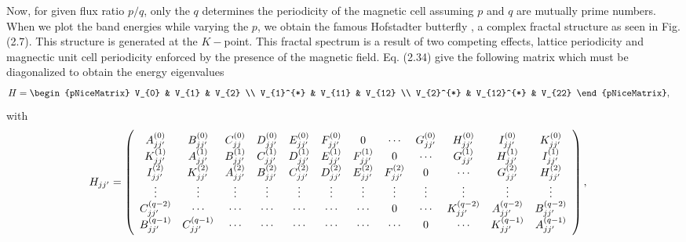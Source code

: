 \documentclass{report}
\begin{document}
Now, for given flux ratio $p/q$, only the $q$ determines the periodicity of the magnetic cell assuming $p$ and $q$ are mutually prime numbers. When we plot the band energies while varying the $p$, we obtain the famous Hofstadter butterfly \cite{PhysRevB.14.2239}, a complex fractal structure as seen in Fig. (2.7). This structure is generated at the $K-$point. This fractal spectrum is a result of two competing effects, lattice periodicity and magnectic unit cell periodicity enforced by the presence of the magnetic field. Eq. (2.34) give the following matrix which must be diagonalized to obtain the energy eigenvalues
\begin{equation}
	\renewcommand{\arraystretch}{0.85}
	\begin{aligned}
		H
		 & =
		\begin{pNiceMatrix}
			V_{0}     & V_{1}      & V_{2}  \\
			V_{1}^{*} & V_{11}     & V_{12} \\
			V_{2}^{*} & V_{12}^{*} & V_{22}
		\end{pNiceMatrix},
	\end{aligned}
\end{equation}
with
\begin{equation}
	\renewcommand{\arraystretch}{0.85}
	\begin{aligned}
		H_{jj'}
		 & =
		\left(
			\begin{array}{c c c c c c c c c c c c }
				A_{jj'}^{(0)} & B_{jj'}^{(0)} & C_{jj}^{(0)} & D_{jj'}^{(0)} & E_{jj'}^{(0)} & F_{jj'}^{(0)} & 0 & \cdots & G_{jj'}^{(0)} & H_{jj'}^{(0)} & I_{jj'}^{(0)} & K_{jj'}^{(0)}\\
				K_{jj'}^{(1)} & A_{jj'}^{(1)} & B_{jj'}^{(1)} & C_{jj'}^{(1)} & D_{jj'}^{(1)} & E_{jj'}^{(1)} & F_{jj'}^{(1)} & 0 & \cdots & G_{jj'}^{(1)} & H_{jj'}^{(1)} & I_{jj'}^{(1)} \\
				I_{jj'}^{(2)} & K_{jj'}^{(2)} & A_{jj'}^{(2)} & B_{jj'}^{(2)} & C_{jj'}^{(2)} & D_{jj'}^{(2)} & E_{jj'}^{(2)} & F_{jj'}^{(2)} & 0 & \cdots & G_{jj'}^{(2)} & H_{jj'}^{(2)} \\
				\vdots & \vdots & \vdots & \vdots & \vdots & \vdots & \vdots & \vdots & \vdots & \vdots & \vdots & \vdots\\
				C_{jj'}^{(q-2)} & \cdots & \cdots & \cdots & \cdots & \cdots & \cdots & 0 & \cdots & K_{jj'}^{(q-2)} & A_{jj'}^{(q-2)} & B_{jj'}^{(q-2)} \\
				B_{jj'}^{(q-1)} & C_{jj'}^{(q-1)} & \cdots & \cdots & \cdots & \cdots & \cdots & \cdots & 0 & \cdots & K_{jj'}^{(q-1)} & A_{jj'}^{(q-1)} \\
			\end{array}
		\right),
	\end{aligned}
\end{equation}
\end{document}
